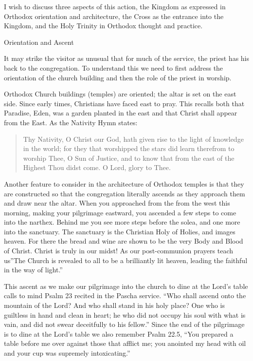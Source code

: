 \documentclass[
]{article}
\begin{document}
I wish to discuss three aspects of this action, the Kingdom as expressed
in Orthodox orientation and architecture, the Cross as the entrance into
the Kingdom, and the Holy Trinity in Orthodox thought and practice.

Orientation and Ascent

It may strike the visitor as unusual that for much of the service, the
priest has his back to the congregation. To understand this we need to
first address the orientation of the church building and then the role
of the priest in worship.

Orthodox Church buildings (temples) are oriented; the altar is set on
the east side. Since early times, Christians have faced east to pray.
This recalls both that Paradise, Eden, was a garden planted in the east
and that Christ shall appear from the East. As the Nativity Hymn states:

\begin{quote}
Thy Nativity, O Christ our God, hath given rise to the light of
knowledge in the world; for they that worshipped the stars did learn
therefrom to worship Thee, O Sun of Justice, and to know that from the
east of the Highest Thou didst come. O Lord, glory to Thee.
\end{quote}

Another feature to consider in the architecture of Orthodox temples is
that they are constructed so that the congregation literally ascends as
they approach them and draw near the altar. When you approached from the
from the west this morning, making your pilgrimage eastward, you
ascended a few steps to come into the narthex. Behind me you see more
steps before the solea, and one more into the sanctuary. The sanctuary
is the Christian Holy of Holies, and images heaven. For there the bread
and wine are shown to be the very Body and Blood of Christ. Christ is
truly in our midst! As our post-communion prayers teach us''The Church
is revealed to all to be a brilliantly lit heaven, leading the faithful
in the way of light.''

This ascent as we make our pilgrimage into the church to dine at the
Lord's table calls to mind Psalm 23 recited in the Pascha service. ``Who
shall ascend onto the mountain of the Lord? And who shall stand in his
holy place? One who is guiltless in hand and clean in heart; he who did
not occupy his soul with what is vain, and did not swear deceitfully to
his fellow.'' Since the end of the pilgrimage is to dine at the Lord's
table we also remember Psalm 22.5, ``You prepared a table before me over
against those that afflict me; you anointed my head with oil and your
cup was supremely intoxicating.''
\end{document}

